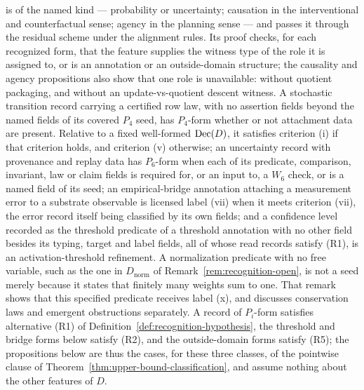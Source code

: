 is of the named kind --- probability or uncertainty; causation in the
interventional and counterfactual sense; agency in the planning sense --- and
passes it through the residual scheme under the alignment rules. Its proof
checks, for each recognized form, that the feature supplies the witness type
of the role it is assigned to, or is an annotation or an outside-domain
structure; the causality and agency propositions also show that one role is
unavailable: \Pfive{} without quotient packaging, and \Pone{} without an
update-vs-quotient descent witness. A stochastic transition record carrying a certified row law, with no assertion
fields beyond the named fields of its covered \(P_4\) seed, has \(P_4\)-form
whether or not attachment data are present. Relative to a fixed well-formed
\(\operatorname{Dec}\!\left(D\right)\), it satisfies criterion (i) if that criterion holds, and criterion
(v) otherwise; an uncertainty record with provenance and replay data
has \(P_6\)-form when each of its predicate, comparison, invariant, law or claim
fields is required for, or an input to, a \(W_6\) check, or is a named field of
its seed; an empirical-bridge annotation attaching a measurement error to a substrate observable is licensed label (vii) when it meets criterion (vii), the error record itself being classified by its own fields; and a
confidence level recorded as the threshold predicate of a threshold annotation
with no other field besides its typing, target and label fields, all of whose
read records satisfy (R1), is an activation-threshold refinement. A normalization predicate with no free variable, such as the
one in \(D_{\mathrm{norm}}\) of Remark~\ref{rem:recognition-open}, is not a
\Ptwo{} seed merely because it states that finitely many weights sum to
one. That remark shows that this
specified predicate receives label (x), and discusses conservation laws and
emergent obstructions separately.
A record of \(P_i\)-form satisfies alternative (R1) of
Definition~\ref{def:recognition-hypothesis}, the threshold and bridge forms below
satisfy (R2), and the outside-domain forms satisfy (R5); the propositions below
are thus the cases, for these three classes, of the pointwise clause of
Theorem~\ref{thm:upper-bound-classification}, and assume nothing about the other
features of \(D\).

